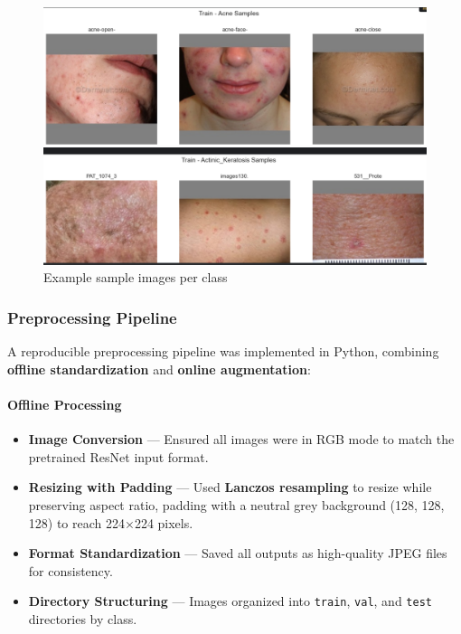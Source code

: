 \documentclass[
  12pt,
  oneside]{article}
\providecommand{\tightlist}{%
  \setlength{\itemsep}{0pt}\setlength{\parskip}{0pt}}
\begin{document}
\begin{figure}

{\centering \includegraphics[width=1\linewidth]{class_sample_images} 

}

\caption{Example sample images per class}\label{fig:unnamed-chunk-3}
\end{figure}

\subsubsection{Preprocessing Pipeline}\label{preprocessing-pipeline}

A reproducible preprocessing pipeline was implemented in Python,
combining \textbf{offline standardization} and \textbf{online
augmentation}:

\paragraph{Offline Processing}\label{offline-processing}

\begin{itemize}
\tightlist
\item
  \textbf{Image Conversion} --- Ensured all images were in RGB mode to
  match the pretrained ResNet input format.
\item
  \textbf{Resizing with Padding} --- Used \textbf{Lanczos resampling} to
  resize while preserving aspect ratio, padding with a neutral grey
  background (128, 128, 128) to reach 224×224 pixels.
\item
  \textbf{Format Standardization} --- Saved all outputs as high-quality
  JPEG files for consistency.
\item
  \textbf{Directory Structuring} --- Images organized into
  \texttt{train}, \texttt{val}, and \texttt{test} directories by class.
\end{itemize}
\end{document}
